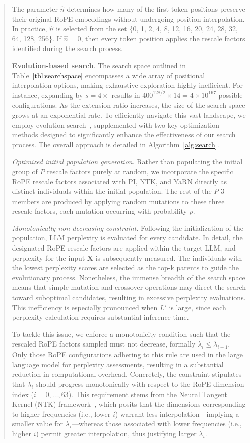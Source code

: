\begin{abstract}
The parameter $\hat{n}$ determines how many of the first token positions preserve their original RoPE embeddings without undergoing position interpolation. In practice, $\hat{n}$ is selected from the set \{0, 1, 2, 4, 8, 12, 16, 20, 24, 28, 32, 64, 128, 256\}. If $\hat{n}=0$, then every token position applies the rescale factors identified during the search process.

\textbf{Evolution-based search}. The search space outlined in Table~\ref{tbl:searchspace} encompasses a wide array of positional interpolation options, making exhaustive exploration highly inefficient. For instance, expanding by $s=4\times$ results in $400^{128/2}\times14=4\times10^{167}$ possible configurations. As the extension ratio increases, the size of the search space grows at an exponential rate. To efficiently navigate this vast landscape, we employ evolution search~\cite{guo2020single}, supplemented with two key optimization methods designed to significantly enhance the effectiveness of our search process. The overall approach is detailed in Algorithm~\ref{alg:search}.

\textit{Optimized initial population generation}. Rather than populating the initial group of $P$ rescale factors purely at random, we incorporate the specific RoPE rescale factors associated with PI, NTK, and YaRN directly as distinct individuals within the initial population. The rest of the $P$-3 members are produced by applying random mutations to these three rescale factors, each mutation occurring with probability $p$.

\textit{Monotonically non-decreasing constraint}. Following the initialization of the population, LLM perplexity is evaluated for every candidate. In detail, the designated RoPE rescale factors are applied within the target LLM, and perplexity for the input $\mathbf{X}$ is subsequently measured. The individuals with the lowest perplexity scores are selected as the top-k parents to guide the evolutionary process. Nonetheless, the immense breadth of the search space means that simple mutation and crossover operations may direct the search toward suboptimal candidates, resulting in excessive perplexity evaluations. This inefficiency is especially pronounced when $L'$ is large, since each perplexity calculation requires substantial inference time.

To tackle this issue, we enforce a monotonicity condition such that the rescaled RoPE factors sampled must not decrease, formally $\lambda_i \leq \lambda_{i+1}$. Only those RoPE configurations adhering to this rule are used in the large language model for perplexity assessments, resulting in a substantial reduction in computational overhead. Concretely, the constraint stipulates that $\lambda_i$ should progress monotonically with respect to the RoPE dimension index ($i = 0,\ldots, 63$). This requirement stems from the Neural Tangent Kernel (NTK) framework~\cite{jacot2018neural,tancik2020fourier,ntk}, which posits that the dimensions corresponding to higher frequencies (i.e., lower $i$) warrant less interpolation—implying a smaller value for $\lambda_i$—whereas those associated with lower frequencies (i.e., higher $i$) permit greater interpolation, thus justifying larger $\lambda_i$.


\end{abstract}

